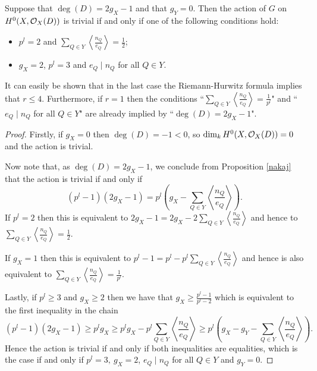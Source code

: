     \begin{cor}
    Suppose that $\deg(D)= 2g_X-1$ and that $g_Y=0$. Then the action of $G$ on $H^0(X,{\cal O}_X(D))$ is trivial if and only if one of the following conditions hold:
        \begin{itemize}
        \item  $p^l=2$ and $\sum_{Q\in Y}\left\langle\frac{n_Q}{e_Q}\right\rangle=\frac{1}{2}$;
        \item  $g_X=2$, $p^l=3$ and $e_Q\mid n_Q$ for all $Q\in Y$.
        \end{itemize}
    \end{cor}


    \begin{rem}
    It can easily be shown that in the last case the Riemann-Hurwitz formula implies that $r\leq 4$. 
    Furthermore, if $r=1$ then the conditions ``$\sum_{Q\in Y}\left\langle\frac{n_Q}{e_Q}\right\rangle=\frac{1}{p^l}$" and ``$e_Q\mid n_Q$ for all $Q\in Y$" are already implied by ``$\deg(D)=2g_X-1$".
    \end{rem}

    \begin{proof}
    Firstly, if $g_X=0$ then $\deg(D)=-1<0$, so $\dim_kH^0(X,{\cal O}_X(D))=0$ and the action is trivial.
    
    Now note that, as $\deg(D)=2g_X-1$, we conclude from Proposition \ref{nakaj} that the action is trivial if and only if 
        \begin{equation*}
        (p^l-1)(2g_X-1)=p^l\left(g_X-\sum_{Q\in Y}\left\langle\frac{n_Q}{e_Q}\right\rangle\right).
        \end{equation*}
    If $p^l=2$ then this is equivalent to $2g_X-1=2g_X-2\sum_{Q\in Y}\left\langle\frac{n_Q}{e_Q}\right\rangle$ and hence to $\sum_{Q\in Y}\left\langle\frac{n_Q}{e_Q}\right\rangle=\frac{1}{2}$.
    
    If $g_X=1$ then this is equivalent to $p^l-1=p^l-p^l\sum_{Q\in Y}\left\langle\frac{n_Q}{e_Q}\right\rangle$ and hence is also equivalent to $\sum_{Q\in Y}\left\langle\frac{n_Q}{e_Q}\right\rangle=\frac{1}{p^l}$.
    
    Lastly, if $p^l\geq 3$ and $g_X\geq 2$ then we have that $g_X\geq \frac{p^l-1}{p^l-2}$ which is equivalent to the first inequality in the chain
        \begin{equation*}
        (p^l-1)(2g_X-1)\geq p^lg_X\geq p^lg_X-p^l\sum_{Q\in Y}\left\langle\frac{n_Q}{e_Q}\right\rangle \geq p^l\left( g_X - g_Y -\sum_{Q\in Y} \left\langle \frac{n_Q}{e_Q} \right\rangle \right).
        \end{equation*}
    Hence the action is trivial if and only if both inequalities are equalities, which is the case if and only if $p^l=3,\ g_X=2$, $e_Q\mid n_Q$ for all $Q\in Y$ and $g_Y = 0$.
    \end{proof}


